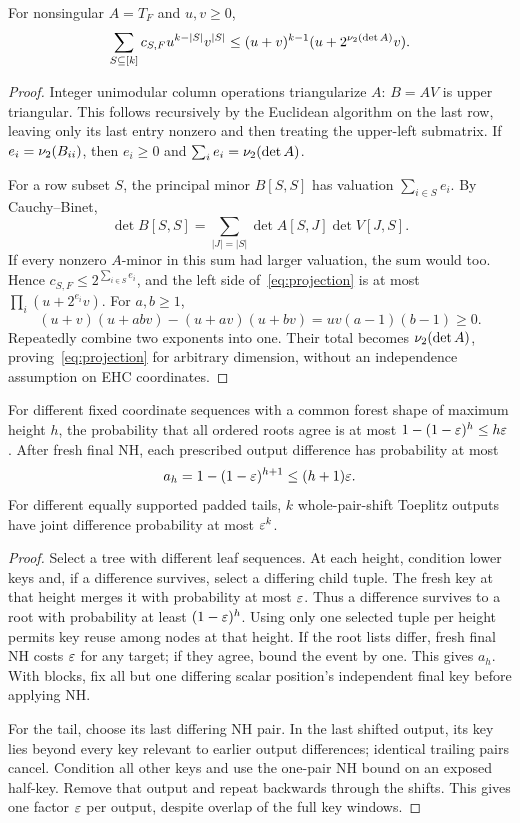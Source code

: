 \begin{lemma}\label{lem:projection}
For nonsingular $A=T_F$ and $u,v\ge0$,
\begin{equation}\label{eq:projection}
 \sum_{S\subseteq[k]}c_{S,F}u^{k-|S|}v^{|S|}
 \le(u+v)^{k-1}(u+2^{\nu_2(\det A)}v).
\end{equation}
\end{lemma}
\begin{proof}
Integer unimodular column operations triangularize $A$: $B=AV$ is upper triangular. This follows recursively by the Euclidean algorithm on the last row, leaving only its last entry nonzero and then treating the upper-left submatrix. If $e_i=\nu_2(B_{ii})$, then $e_i\ge0$ and $\sum_i e_i=\nu_2(\det A)$.

For a row subset $S$, the principal minor $B[S,S]$ has valuation $\sum_{i\in S}e_i$. By Cauchy--Binet,
\[
 \det B[S,S]=\sum_{|J|=|S|}\det A[S,J]\det V[J,S].
\]
If every nonzero $A$-minor in this sum had larger valuation, the sum would too. Hence $c_{S,F}\le2^{\sum_{i\in S}e_i}$, and the left side of~\eqref{eq:projection} is at most $\prod_i(u+2^{e_i}v)$. For $a,b\ge1$,
\[
 (u+v)(u+abv)-(u+av)(u+bv)=uv(a-1)(b-1)\ge0.
\]
Repeatedly combine two exponents into one. Their total becomes $\nu_2(\det A)$, proving~\eqref{eq:projection} for arbitrary dimension, without an independence assumption on EHC coordinates.
\end{proof}

\begin{lemma}\label{lem:forest}
For different fixed coordinate sequences with a common forest shape of maximum height $h$, the probability that all ordered roots agree is at most $1-(1-\varepsilon)^h\le h\varepsilon$. After fresh final NH, each prescribed output difference has probability at most
\[
 a_h=1-(1-\varepsilon)^{h+1}\le(h+1)\varepsilon.
\]
For different equally supported padded tails, $k$ whole-pair-shift Toeplitz outputs have joint difference probability at most $\varepsilon^k$.
\end{lemma}
\begin{proof}
Select a tree with different leaf sequences. At each height, condition lower keys and, if a difference survives, select a differing child tuple. The fresh key at that height merges it with probability at most $\varepsilon$. Thus a difference survives to a root with probability at least $(1-\varepsilon)^h$. Using only one selected tuple per height permits key reuse among nodes at that height. If the root lists differ, fresh final NH costs $\varepsilon$ for any target; if they agree, bound the event by one. This gives $a_h$. With blocks, fix all but one differing scalar position's independent final key before applying NH.

For the tail, choose its last differing NH pair. In the last shifted output, its key lies beyond every key relevant to earlier output differences; identical trailing pairs cancel. Condition all other keys and use the one-pair NH bound on an exposed half-key. Remove that output and repeat backwards through the shifts. This gives one factor $\varepsilon$ per output, despite overlap of the full key windows.
\end{proof}

